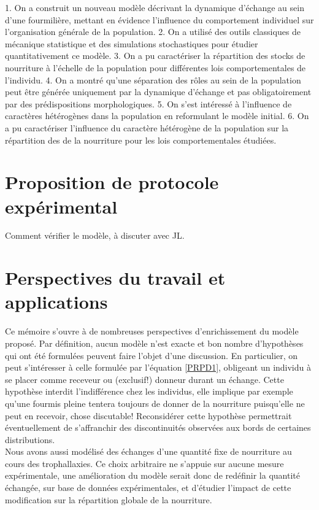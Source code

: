 1. On a construit un nouveau modèle décrivant la dynamique d'échange au sein d'une fourmilière, mettant en évidence l'influence du comportement individuel sur l'organisation générale de la population.
2. On a utilisé des outils classiques de mécanique statistique et des simulations stochastiques pour étudier quantitativement ce modèle.
3. On a pu caractériser la répartition des stocks de nourriture à l'échelle de la population pour différentes lois comportementales de l'individu.
4. On a montré qu'une séparation des rôles au sein de la population peut être générée uniquement par la dynamique d'échange et pas obligatoirement par des prédispositions morphologiques.
5. On s'est intéressé à l'influence de caractères hétérogènes dans la population en reformulant le modèle initial. 
6. On a pu caractériser l'influence du caractère hétérogène de la population sur la répartition des de la nourriture pour les lois comportementales étudiées.




\section{Proposition de protocole expérimental}
Comment vérifier le modèle, à discuter avec JL.

\section{Perspectives du travail et applications}

Ce mémoire s'ouvre à de nombreuses perspectives d'enrichissement du modèle proposé. Par définition, aucun modèle n'est exacte et bon nombre d'hypothèses qui ont été formulées peuvent faire l'objet d'une discussion. En particulier, on peut s'intéresser à celle formulée par l'équation \ref{PRPD1}, obligeant un individu à se placer comme receveur ou (exclusif!) donneur durant un échange. Cette hypothèse interdit l'indifférence chez les individus, elle implique par exemple qu'une fourmis pleine tentera toujours de donner de la nourriture puisqu'elle ne peut en recevoir, chose discutable! Reconsidérer cette hypothèse permettrait éventuellement de s'affranchir des discontinuités observées aux bords de certaines distributions.\\
Nous avons aussi modélisé des échanges d'une quantité fixe de nourriture au cours des trophallaxies. Ce choix arbitraire ne s'appuie sur aucune mesure expérimentale, une amélioration du modèle serait donc de redéfinir la quantité échangée, sur base de données expérimentales, et d'étudier l'impact de cette modification sur la répartition globale de la nourriture.\\

